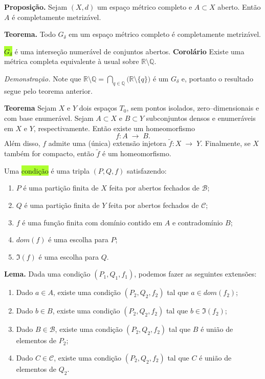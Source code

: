 \documentclass{article}
\begin{document}
\begin{landscape}
\begin{multicols}{3}
\medskip

\textbf{Proposição.} Sejam \((X,d)\) um espaço métrico completo e \(A\subset X\) aberto. Então \(A\) é completamente metrizável.

\medskip

\textbf{Teorema.} Todo \(G_\delta\) em um espaço métrico completo é completamente metrizável.

\colorbox{GreenYellow}{\(G_\delta\)} é uma interseção numerável de conjuntos abertos.
\medskip
\textbf{Corolário} Existe uma métrica completa equivalente à usual sobre \(\mathbb{R}\setminus\mathbb{Q}\).

\textit{Demonstração.} Note que
$
\mathbb{R}\setminus\mathbb{Q}
=\bigcap_{q\in\mathbb{Q}}\bigl(\mathbb{R}\setminus\{q\}\bigr)
$
é um \(G_\delta\) e, portanto o resultado segue pelo teorema anterior.

\medskip

\textbf{Teorema} Sejam \(X\) e \(Y\) dois espaços \(T_0\), sem pontos isolados, zero–dimensionais e com base enumerável. Sejam \(A\subset X\) e \(B\subset Y\) subconjuntos densos e enumeráveis em \(X\) e \(Y\), respectivamente. Então existe um homeomorfismo
\[
f\colon A \;\longrightarrow\; B.
\]
Além disso, \(f\) admite uma (única) extensão injetora
$
\tilde f\colon X \;\longrightarrow\; Y.
$
Finalmente, se \(X\) também for compacto, então \(\tilde f\) é um homeomorfismo.

\medskip



Uma \colorbox{GreenYellow}{condição} é uma tripla \((P,Q,f)\) satisfazendo:
\begin{enumerate}
  \item \(P\) é uma partição finita de \(X\) feita por abertos fechados de \(\mathcal{B}\);
  \item \(Q\) é uma partição finita de \(Y\) feita por abertos fechados de \(\mathcal{C}\);
  \item \(f\) é uma função finita com domínio contido em \(A\) e contradomínio \(B\);
  \item \(dom(f)\) é uma escolha para \(P\);
  \item \(\Im(f)\) é uma escolha para \(Q\).
\end{enumerate}
\medskip

\textbf{Lema.} Dada uma condição \((P_1, Q_1, f_1)\), podemos fazer as seguintes extensões:
\begin{enumerate}
  \item Dado \(a\in A\), existe uma condição \((P_2, Q_2, f_2)\) tal que \(a\in dom(f_2)\);
  \item Dado \(b\in B\), existe uma condição \((P_2, Q_2, f_2)\) tal que \(b\in\Im(f_2)\);
  \item Dado \(B\in\mathcal{B}\), existe uma condição \((P_2, Q_2, f_2)\) tal que \(B\) é união de elementos de \(P_2\);
  \item Dado \(C\in\mathcal{C}\), existe uma condição \((P_2, Q_2, f_2)\) tal que \(C\) é união de elementos de \(Q_2\).
\end{enumerate}


\end{multicols}
\end{landscape}
\end{document}
